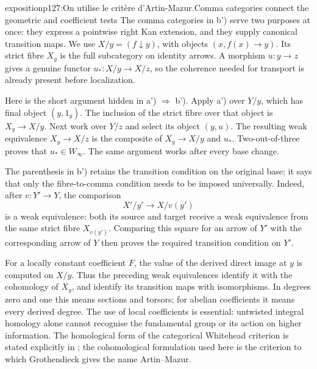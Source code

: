 \begin{dcomment}{exposition}{p127:On utilise le critère d'Artin-Mazur.}{Comma categories connect the geometric and coefficient tests}
The comma categories in b') serve two purposes at once: they express a pointwise right Kan extension, and they supply canonical transition maps. We use \(X/y=(f\downarrow y)\), with objects \((x,f(x)\longrightarrow y)\). Its strict fibre \(X_y\) is the full subcategory on identity arrows. A morphism \(u:y\longrightarrow z\) gives a genuine functor \(u_*:X/y\longrightarrow X/z\), so the coherence needed for transport is already present before localization.

Here is the short argument hidden in a') \(\Rightarrow\) b'). Apply a') over \(Y/y\), which has final object \((y,1_y)\). The inclusion of the strict fibre over that object is \(X_y\longrightarrow X/y\). Next work over \(Y/z\) and select its object \((y,u)\). The resulting weak equivalence \(X_y\longrightarrow X/z\) is the composite of \(X_y\longrightarrow X/y\) and \(u_*\). Two-out-of-three proves that \(u_*\in W_\infty\). The same argument works after every base change.

The parenthesis in b') retains the transition condition on the original base; it says that only the fibre-to-comma condition needs to be imposed universally. Indeed, after \(v:Y'\longrightarrow Y\), the comparison
\[
 X'/y'\longrightarrow X/v(y')
\]
is a weak equivalence: both its source and target receive a weak equivalence from the same strict fibre \(X_{v(y')}\). Comparing this square for an arrow of \(Y'\) with the corresponding arrow of \(Y\) then proves the required transition condition on \(Y'\).

For a locally constant coefficient \(F\), the value of the derived direct image at \(y\) is computed on \(X/y\). Thus the preceding weak equivalences identify it with the cohomology of \(X_y\), and identify its transition maps with isomorphisms. In degrees zero and one this means sections and torsors; for abelian coefficients it means every derived degree. The use of local coefficients is essential: untwisted integral homology alone cannot recognise the fundamental group or its action on higher information. The homological form of the categorical Whitehead criterion is stated explicitly in \citet[Proposition 2.4]{Thomason1980}; the cohomological formulation used here is the criterion to which Grothendieck gives the name Artin--Mazur.
\end{dcomment}


